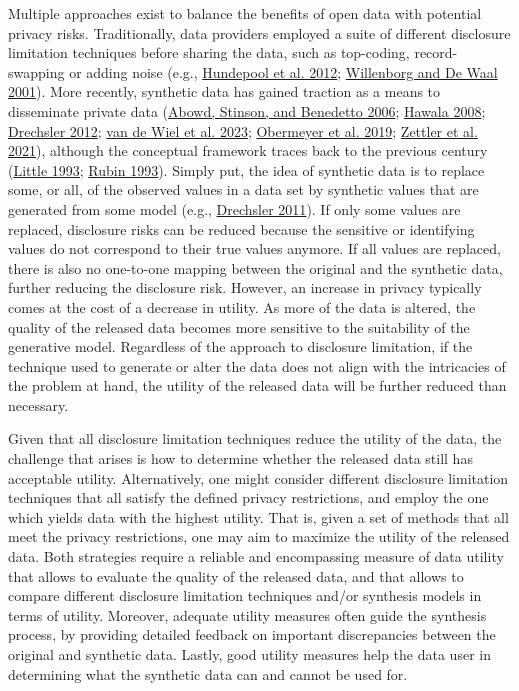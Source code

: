 \documentclass[
]{article}
\begin{document}
Multiple approaches exist to balance the benefits of open data with
potential privacy risks. Traditionally, data providers employed a suite
of different disclosure limitation techniques before sharing the data,
such as top-coding, record-swapping or adding noise (e.g.,
\protect\hyperlink{ref-hundepool_disclosure_2012}{Hundepool et al.
2012}; \protect\hyperlink{ref-willenborg_elements_2001}{Willenborg and
De Waal 2001}). More recently, synthetic data has gained traction as a
means to disseminate private data
(\protect\hyperlink{ref-SIPP_Beta_2006}{Abowd, Stinson, and Benedetto
2006}; \protect\hyperlink{ref-hawala_synthetic_2008}{Hawala 2008};
\protect\hyperlink{ref-drechsler2012}{Drechsler 2012};
\protect\hyperlink{ref-vandewiel2023}{van de Wiel et al. 2023};
\protect\hyperlink{ref-obermeyer2019}{Obermeyer et al. 2019};
\protect\hyperlink{ref-zettler2021}{Zettler et al. 2021}), although the
conceptual framework traces back to the previous century
(\protect\hyperlink{ref-little_statistical_1993}{Little 1993};
\protect\hyperlink{ref-rubin_statistical_1993}{Rubin 1993}). Simply put,
the idea of synthetic data is to replace some, or all, of the observed
values in a data set by synthetic values that are generated from some
model (e.g., \protect\hyperlink{ref-drechsler2011synthetic}{Drechsler
2011}). If only some values are replaced, disclosure risks can be
reduced because the sensitive or identifying values do not correspond to
their true values anymore. If all values are replaced, there is also no
one-to-one mapping between the original and the synthetic data, further
reducing the disclosure risk. However, an increase in privacy typically
comes at the cost of a decrease in utility. As more of the data is
altered, the quality of the released data becomes more sensitive to the
suitability of the generative model. Regardless of the approach to
disclosure limitation, if the technique used to generate or alter the
data does not align with the intricacies of the problem at hand, the
utility of the released data will be further reduced than necessary.

Given that all disclosure limitation techniques reduce the utility of
the data, the challenge that arises is how to determine whether the
released data still has acceptable utility. Alternatively, one might
consider different disclosure limitation techniques that all satisfy the
defined privacy restrictions, and employ the one which yields data with
the highest utility. That is, given a set of methods that all meet the
privacy restrictions, one may aim to maximize the utility of the
released data. Both strategies require a reliable and encompassing
measure of data utility that allows to evaluate the quality of the
released data, and that allows to compare different disclosure
limitation techniques and/or synthesis models in terms of utility.
Moreover, adequate utility measures often guide the synthesis process,
by providing detailed feedback on important discrepancies between the
original and synthetic data. Lastly, good utility measures help the data
user in determining what the synthetic data can and cannot be used for.
\end{document}
